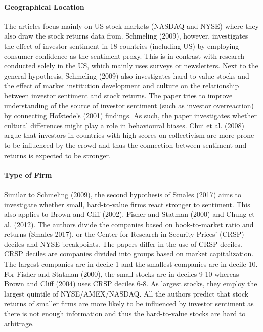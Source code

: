 \paragraph{Geographical Location}
The articles focus mainly on US stock markets (NASDAQ and NYSE) where they also draw the stock returns data from. Schmeling (2009), however, investigates the effect of investor sentiment in 18 countries (including US) by employing consumer confidence as the sentiment proxy. This is in contrast with research conducted solely in the US, which mainly uses surveys or newsletters. Next to the general hypothesis, Schmeling (2009) also investigates hard-to-value stocks and the effect of market institution development and culture on the relationship between investor sentiment and stock returns. The paper tries to improve understanding of the source of investor sentiment (such as investor overreaction) by connecting Hofstede's (2001) findings. As such, the paper investigates whether cultural differences might play a role in behavioural biases. Chui et al. (2008) argue that investors in countries with high scores on collectivism are more prone to be influenced by the crowd and thus the connection between sentiment and returns is expected to be stronger.

\paragraph{Type of Firm}
Similar to Schmeling (2009), the second hypothesis of Smales (2017) aims to investigate whether small, hard-to-value firms react stronger to sentiment. This also applies to Brown and Cliff (2002), Fisher and Statman (2000) and Chung et al. (2012). The authors divide the companies based on book-to-market ratio and returns (Smales 2017), or the Center for Research in Security Prices' (CRSP) deciles and NYSE breakpoints. The papers differ in the use of CRSP deciles. CRSP deciles are companies divided into groups based on market capitalization.  The largest companies are in decile 1 and the smallest companies are in decile 10. For Fisher and Statman (2000), the small stocks are in deciles 9-10 whereas Brown and Cliff (2004) uses CRSP deciles 6-8. As largest stocks, they employ the largest quintile of NYSE/AMEX/NASDAQ. All the authors predict that stock returns of smaller firms are more likely to be influenced by investor sentiment as there is not enough information and thus the hard-to-value stocks are hard to arbitrage.

